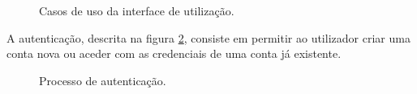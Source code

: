 \vspace{1cm}%

\begin{figure}[h!]
\begin{center}
\caption{Casos de uso da interface de utilização.}
\label{fig:state_processamento}
\end{center}
\end{figure}

A autenticação, descrita na figura \ref{fig:state_autenticacao}, consiste em permitir ao utilizador criar uma conta nova ou aceder com as credenciais de uma conta já existente.

\begin{figure}[ht!]
\begin{center}
\caption{Processo de autenticação.}
\label{fig:state_autenticacao}
\end{center}
\end{figure}

